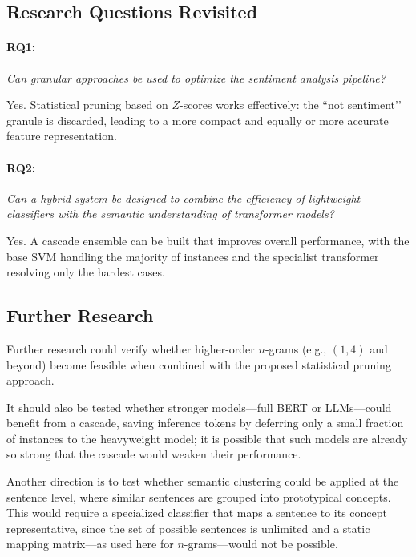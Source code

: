 \documentclass[a4paper,twoside,12pt]{book}
\newcommand{\zscore}{Z}
\begin{document}
\subsection{Research Questions Revisited}

\paragraph{RQ1:} \emph{Can granular approaches be used to optimize the sentiment analysis pipeline?}

Yes. Statistical pruning based on $\zscore$-scores works effectively: the ``not sentiment’’ granule is discarded, leading to a more compact and equally or more accurate feature representation.

\paragraph{RQ2:} \emph{Can a hybrid system be designed to combine the efficiency of lightweight classifiers with the semantic understanding of transformer models?}

Yes. A cascade ensemble can be built that improves overall performance, with the base SVM handling the majority of instances and the specialist transformer resolving only the hardest cases.

\subsection{Further Research}

Further research could verify whether higher-order $n$-grams (e.g., $(1,4)$ and beyond) become feasible when combined with the proposed statistical pruning approach.

It should also be tested whether stronger models---full BERT or LLMs---could benefit from a cascade, saving inference tokens by deferring only a small fraction of instances to the heavyweight model; it is possible that such models are already so strong that the cascade would weaken their performance.

Another direction is to test whether semantic clustering could be applied at the sentence level, where similar sentences are grouped into prototypical concepts. This would require a specialized classifier that maps a sentence to its concept representative, since the set of possible sentences is unlimited and a static mapping matrix---as used here for $n$-grams---would not be possible.

\backmatter
\end{document}

